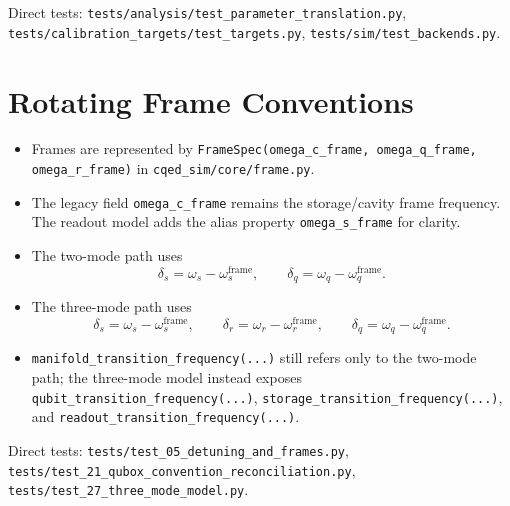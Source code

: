\documentclass[11pt]{article}
\begin{document}
\noindent
Direct tests:
\texttt{tests/analysis/test\_parameter\_translation.py},
\texttt{tests/calibration\_targets/test\_targets.py},
\texttt{tests/sim/test\_backends.py}.

\section{Rotating Frame Conventions}
\begin{itemize}[leftmargin=1.5em]
  \item Frames are represented by
  \texttt{FrameSpec(omega\_c\_frame, omega\_q\_frame, omega\_r\_frame)} in
  \texttt{cqed\_sim/core/frame.py}.
  \item The legacy field \texttt{omega\_c\_frame} remains the storage/cavity frame
  frequency. The readout model adds the alias property \texttt{omega\_s\_frame}
  for clarity.
  \item The two-mode path uses
  \[
  \delta_s=\omega_s-\omega_s^{\mathrm{frame}},
  \qquad
  \delta_q=\omega_q-\omega_q^{\mathrm{frame}}.
  \]
  \item The three-mode path uses
  \[
  \delta_s=\omega_s-\omega_s^{\mathrm{frame}},\qquad
  \delta_r=\omega_r-\omega_r^{\mathrm{frame}},\qquad
  \delta_q=\omega_q-\omega_q^{\mathrm{frame}}.
  \]
  \item \texttt{manifold\_transition\_frequency(...)} still refers only to the
  two-mode path; the three-mode model instead exposes
  \texttt{qubit\_transition\_frequency(...)},
  \texttt{storage\_transition\_frequency(...)}, and
  \texttt{readout\_transition\_frequency(...)}.
\end{itemize}

\noindent
Direct tests:
\texttt{tests/test\_05\_detuning\_and\_frames.py},
\texttt{tests/test\_21\_qubox\_convention\_reconciliation.py},
\texttt{tests/test\_27\_three\_mode\_model.py}.
\end{document}
